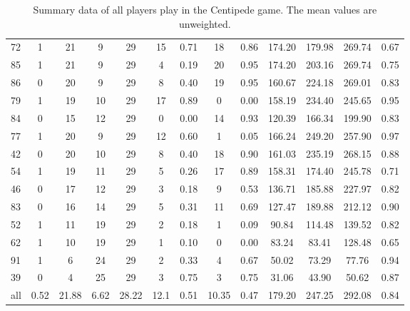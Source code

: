 \documentclass[a4paper,12pt,american]{article}
\theoremstyle{definition}
\begin{document}
\begin{table}[H]
{\begin{tabular}{lcccccccccccc}
	72  &     1 &        21 &      9 &    29 &      15 &    0.71 &     18 &   0.86 &  174.20 &  179.98 &  269.74 &  0.67 \\
	85  &     1 &        21 &      9 &    29 &       4 &    0.19 &     20 &   0.95 &  174.20 &  203.16 &  269.74 &  0.75 \\
	86  &     0 &        20 &      9 &    29 &       8 &    0.40 &     19 &   0.95 &  160.67 &  224.18 &  269.01 &  0.83 \\
	79  &     1 &        19 &     10 &    29 &      17 &    0.89 &      0 &   0.00 &  158.19 &  234.40 &  245.65 &  0.95 \\
	84  &     0 &        15 &     12 &    29 &       0 &    0.00 &     14 &   0.93 &  120.39 &  166.34 &  199.90 &  0.83 \\
	77  &     1 &        20 &      9 &    29 &      12 &    0.60 &      1 &   0.05 &  166.24 &  249.20 &  257.90 &  0.97 \\
	42  &     0 &        20 &     10 &    29 &       8 &    0.40 &     18 &   0.90 &  161.03 &  235.19 &  268.15 &  0.88 \\
	54  &     1 &        19 &     11 &    29 &       5 &    0.26 &     17 &   0.89 &  158.31 &  174.40 &  245.78 &  0.71 \\
	46  &     0 &        17 &     12 &    29 &       3 &    0.18 &      9 &   0.53 &  136.71 &  185.88 &  227.97 &  0.82 \\
	83  &     0 &        16 &     14 &    29 &       5 &    0.31 &     11 &   0.69 &  127.47 &  189.88 &  212.12 &  0.90 \\
	52  &     1 &        11 &     19 &    29 &       2 &    0.18 &      1 &   0.09 &   90.84 &  114.48 &  139.52 &  0.82 \\
	62  &     1 &        10 &     19 &    29 &       1 &    0.10 &      0 &   0.00 &   83.24 &   83.41 &  128.48 &  0.65 \\
	91  &     1 &         6 &     24 &    29 &       2 &    0.33 &      4 &   0.67 &   50.02 &   73.29 &   77.76 &  0.94 \\
	39  &     0 &         4 &     25 &    29 &       3 &    0.75 &      3 &   0.75 &   31.06 &   43.90 &   50.62 &  0.87 \\
	\midrule
	all &  0.52 &     21.88 &   6.62 &  28.22 &    12.1 &    0.51 &  10.35 &   0.47 &  179.20 &  247.25 &  292.08 &  0.84 \\
	\bottomrule
	\end{tabular}


	}
	\caption{Summary data of all players play in the Centipede game. The mean values are unweighted.}
\end{table}
\end{document}
